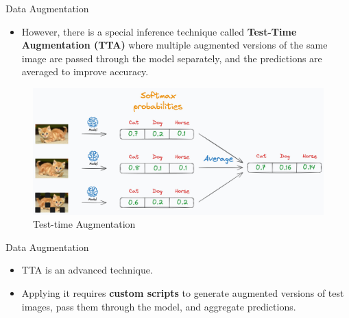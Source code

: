 \begin{frame}{Data Augmentation}
\begin{itemize}
       \item However, there is a special inference technique called \textbf{Test-Time Augmentation (TTA)} where multiple augmented versions of the same image are passed through the model separately, and the predictions are averaged to improve accuracy.
\end{itemize}
\begin{figure}
    \centering
    \includegraphics[width=1.0\textwidth,height=1.0\textheight,keepaspectratio]{images/tta.jpg}
    \caption{Test-time Augmentation}
    \end{figure}
\end{frame}

\begin{frame}{Data Augmentation}
\begin{itemize}
    \item TTA is an advanced technique.
    \item Applying it requires \textbf{custom scripts} to generate augmented versions of test images, pass them through the model, and aggregate predictions.
\end{itemize}
\end{frame} 